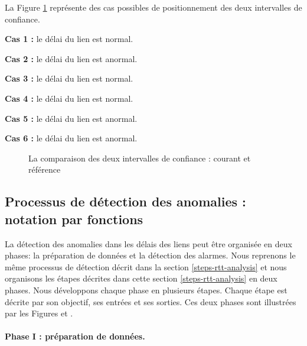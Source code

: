 La Figure 	\ref{fig:intervals-comparaison} représente des cas possibles de positionnement des deux intervalles de confiance.

\textbf{Cas 1 :} le délai du lien est normal.

\textbf{Cas 2 :} le délai du lien est anormal.

\textbf{Cas 3 :} le délai du lien est normal.

\textbf{Cas 4 :} le délai du lien est normal.

\textbf{Cas 5 :} le délai du lien est anormal.

\textbf{Cas 6 :} le délai du lien est anormal.


\begin{figure}[h]
	\centering
	\captionsetup{justification=centering}
	\resizebox{\textwidth}{!}{
		
	}
	\caption{La comparaison des deux intervalles de confiance : courant et référence }
	\label{fig:intervals-comparaison}
\end{figure}



\subsection{Processus de détection des anomalies :  notation par fonctions} \label{processus-de-detection}
La détection des anomalies dans les délais des liens peut être organisée en deux phases: la préparation de données et la détection des alarmes. Nous reprenons le même processus de détection décrit dans la section \ref{steps-rtt-analysis} et nous organisons les étapes décrites dans cette section \ref{steps-rtt-analysis} en deux phases. Nous développons chaque phase en plusieurs étapes. Chaque étape est décrite par  son objectif, ses entrées et ses sorties. Ces deux phases sont illustrées par les Figures et .
\paragraph{Phase I : préparation de données.}

